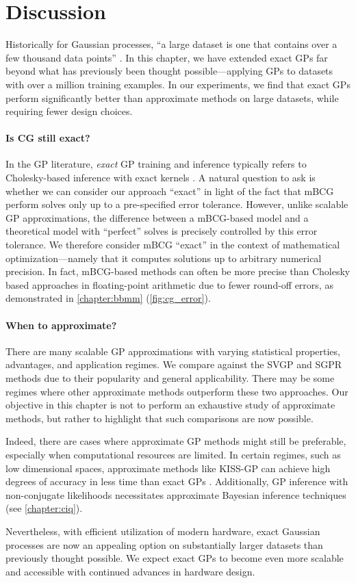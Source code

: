 \section{Discussion}

Historically for Gaussian processes, ``a large dataset is one that contains over a few thousand data points'' \citep{hensman2013gaussian}.
In this chapter, we have extended exact GPs far beyond what has previously been thought possible---applying GPs to datasets with over a million training examples.
In our experiments, we find that exact GPs perform significantly better than approximate methods on large datasets, while requiring fewer design choices.

\paragraph{Is CG still exact?}
In the GP literature, \emph{exact} GP training and inference typically refers to Cholesky-based inference with exact kernels \citep{rasmussen2006gaussian}.
A natural question to ask is whether we can consider our approach ``exact'' in light of the fact that mBCG perform solves only up to a pre-specified error tolerance.
However, unlike scalable GP approximations, the difference between a mBCG-based model and a theoretical model with ``perfect'' solves is precisely controlled by this error tolerance.
We therefore consider mBCG ``exact'' in the context of mathematical optimization---namely that it computes solutions up to arbitrary numerical precision.
In fact, mBCG-based methods can often be more precise than Cholesky based approaches in floating-point arithmetic due to fewer round-off errors, as demonstrated in \cref{chapter:bbmm} (\cref{fig:cg_error}).

\paragraph{When to approximate?}
There are many scalable GP approximations with varying statistical properties, advantages, and application regimes.
We compare against the SVGP and SGPR methods due to their popularity and general applicability.
There may be some regimes where other approximate methods outperform these two approaches.
Our objective in this chapter is not to perform an exhaustive study of approximate methods, but rather to highlight that such comparisons are now possible.

Indeed, there are cases where approximate GP methods might still be preferable, especially when computational resources are limited.
In certain regimes, such as low dimensional spaces, approximate methods like KISS-GP can achieve high degrees of accuracy in less time than exact GPs \cite{wilson2015kernel}.
Additionally, GP inference with non-conjugate likelihoods necessitates approximate Bayesian inference techniques (see \cref{chapter:ciq}).

Nevertheless, with efficient utilization of modern hardware, exact Gaussian processes are now an appealing option on substantially larger datasets than previously thought possible.
We expect exact GPs to become even more scalable and accessible with continued advances in hardware design.
